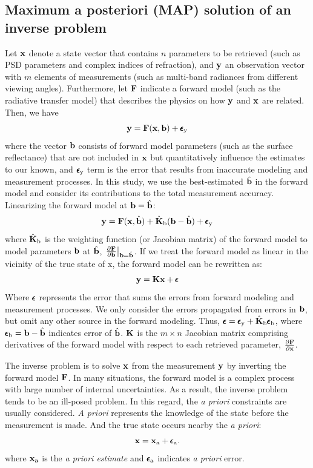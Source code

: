 \subsection{Maximum a posteriori (MAP) solution of an inverse problem}
\label{subsec:map}

Let $\mathbf{x}$ denote a state vector that contains $n$ parameters to be retrieved
(such as PSD parameters and complex indices of refraction), and $\mathbf{y}$ an
observation vector with $m$ elements of measurements (such as multi-band
radiances from different viewing angles). Furthermore, let $\mathbf{F}$ indicate a
forward model (such as the radiative transfer model) that describes the
physics on how $\mathbf{y}$ and $\mathbf{x}$ are related. Then, we have
\begin{equation}
\mathbf{y} = \mathbf{F}(\mathbf{x},\mathbf{b}) + \pmb{\epsilon}_\text{y}
\end{equation}
where the vector $\mathbf{b}$ consists of forward model parameters (such as the
surface reflectance) that are not included in $\mathbf{x}$ but quantitatively
influence the estimates to our known, and $\pmb{\epsilon}_\text{y}$ term is the error that
results from inaccurate modeling and measurement processes. In this
study, we use the best-estimated $\hat{\mathbf{b}}$ in the forward model and consider
its contributions to the total measurement accuracy. Linearizing the
forward model at $\mathbf{b}=\hat{\mathbf{b}}$:
\begin{equation}
\mathbf{y} = \mathbf{F}(\mathbf{x},\hat{\mathbf{b}})+\hat{\mathbf{K}}_\text{b}(\mathbf{b}-\hat{\mathbf{b}})+\pmb{\epsilon}_\text{y}
\label{eq:mfx-b}
\end{equation}
where $\hat{\mathbf{K}}_\text{b}$ is the weighting function (or Jacobian matrix) 
of the forward model to model parameters $\mathbf{b}$ at $\hat{\mathbf{b}}$,
$\left.\frac{\partial\mathbf{F}}{\partial\mathbf{b}}\right|_{\mathbf{b}=\hat{\mathbf{b}}}$. 
If we treat the forward model as
linear in the vicinity of the true state of x, the forward model can be
rewritten as:
\begin{equation}
\mathbf{y} = \mathbf{K}\mathbf{x} + \pmb{\epsilon} \label{eq:mfx}
\end{equation}
Where $\pmb{\epsilon}$ represents the error that sums the errors from forward modeling
and measurement processes. We only consider the errors propagated from
errors in $\mathbf{b}$, but omit any other source in the forward modeling. Thus,
$\pmb{\epsilon}=\pmb{\epsilon}_\text{y}+\hat{\mathbf{K}}_\text{b}\pmb{\epsilon}_\text{b}$, where
$\pmb{\epsilon}_\text{b}=\mathbf{b}-\hat{\mathbf{b}}$ indicates error of $\hat{\mathbf{b}}$. $\mathbf{K}$ is the
$m \times n$ Jacobian matrix comprising derivatives of the forward model
with respect to each retrieved parameter,
$\frac{\partial\mathbf{F}}{\partial\mathbf{x}}$. 

The inverse problem is to solve $\mathbf{x}$ from the measurement $\mathbf{y}$ by
inverting the forward model $\mathbf{F}$. In many situations, the forward
model is a complex process with large number of internal uncertainties.
As a result, the inverse problem tends to be an ill-posed problem. In
this regard, the \textit{a priori} constraints are usually considered.
\textit{A priori} represents the knowledge of the state before the
measurement is made. And the true state occurs nearby the \textit{a
priori}:
\begin{equation}
\mathbf{x} = \mathbf{x}_\text{a} + \pmb{\epsilon}_\text{a}. \label{eq:ap}
\end{equation}
where $\mathbf{x}_\text{a}$ is the \textit{a priori estimate} and $\pmb{\epsilon}_\text{a}$
indicates \textit{a priori} error.

